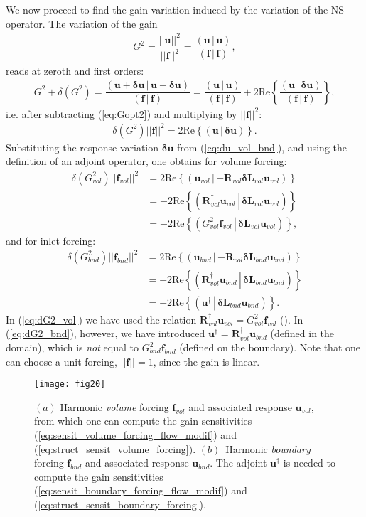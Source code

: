 \documentclass[11pt,onecolumn]{article}
\def\ff {\mathbf{f}}
\def\LL{\mathbf{L}}
\def\RR{\mathbf{R}}
\def\uu {\mathbf{u}}
\newcommand{\ps}   [2]{\ensuremath{\left(\left. {#1} \, \right| \, {#2} \right) }}
\providecommand\bdelta{\boldsymbol{\delta}}\providecommand\bnabla{\boldsymbol{\nabla}}
\begin{document}
We now proceed to find the gain variation induced by the variation of the NS operator.
The variation of the gain
\begin{align}	
G^2 = \dfrac{||\uu||^2}{||\ff||^2} 
= \dfrac{\ps{\uu}{\uu}}{\ps{\ff}{\ff}},
\label{eq:Gopt2}
\end{align}
%
reads at zeroth and first orders: 
%
\begin{align}
G^2+\delta (G^2) 
= \dfrac{\ps{\uu+\bdelta\uu}{\uu+\bdelta\uu}}{\ps{\ff}{\ff}} 
= \dfrac{\ps{\uu}{\uu}}{\ps{\ff}{\ff}}
+ 2 \mbox{Re}
\left\{
\dfrac{\ps{\uu}{\bdelta\uu}}{\ps{\ff}{\ff}} 
\right\},
\end{align}
i.e. after subtracting (\ref{eq:Gopt2}) and multiplying by $||\ff||^2$:
\begin{align}	
\delta (G^2) ||\ff||^2
= 2 \mbox{Re} 
\left\{ 
\ps{\uu}{\bdelta\uu}
\right\}.
\end{align}
%
Substituting the response variation $\bdelta\uu$ from (\ref{eq:du_vol_bnd}), and using the definition of an adjoint operator,
one obtains for volume forcing:
\begin{align}	
\delta (G_{vol}^2) ||\ff_{vol}||^2
&= 
2 \mbox{Re} \left\{\ps{\uu_{vol}}{-\RR_{vol} \bdelta\LL_{vol} \uu_{vol}}\right\}
\nonumber
\\
&=  -2 \mbox{Re} \left\{\ps{\RR_{vol}^\dag \uu_{vol}}{ \bdelta\LL_{vol} \uu_{vol}}\right\}
\nonumber
\\
&= -2 \mbox{Re} \left\{\ps{G_{vol}^2\ff_{vol}}{ \bdelta\LL_{vol} \uu_{vol}}\right\},
\label{eq:dG2_vol}
\end{align}
%
and for inlet forcing:
\begin{align}	
\delta (G_{bnd}^2) ||\ff_{bnd}||^2
&=
2 \mbox{Re} \left\{\ps{\uu_{bnd}}{-\RR_{vol} \bdelta\LL_{bnd}\uu_{bnd}}\right\}
\nonumber
\\
&= -2 \mbox{Re} \left\{\ps{\RR_{vol}^\dag \uu_{bnd}}{ \bdelta\LL_{bnd}\uu_{bnd}}\right\}
\nonumber
\\
&= -2 \mbox{Re} \left\{\ps{\uu^\dag}{ \bdelta\LL_{bnd}\uu_{bnd}}\right\}.
\label{eq:dG2_bnd}
\end{align}
%
In (\ref{eq:dG2_vol}) we have used the  relation 
$\RR_{vol}^\dag \uu_{vol} = G_{vol}^2\ff_{vol}$ (\cite{Brandt11, Boujo15a}).
In (\ref{eq:dG2_bnd}), however, we have introduced 
$\uu^\dag=\RR_{vol}^\dag \uu_{bnd}$ (defined in the domain), which is \textit{not} equal to $G_{bnd}^2\ff_{bnd}$ (defined on the boundary).
Note that one can choose a unit forcing, $||\ff||=1$, since the gain is linear.


\begin{figure}[] %
\centerline{
\texttt{[image: fig20]}
}
\vspace{-0.2cm}
\caption{
$(a)$ Harmonic \textit{volume} forcing $\ff_{vol}$  and associated response $\uu_{vol}$, from which one  can compute the gain sensitivities (\ref{eq:sensit_volume_forcing_flow_modif}) and (\ref{eq:struct_sensit_volume_forcing}).
$(b)$~Harmonic \textit{boundary} forcing $\ff_{bnd}$  and associated response $\uu_{bnd}$.
The adjoint $\uu^\dag$ is needed to compute the gain sensitivities 
(\ref{eq:sensit_boundary_forcing_flow_modif})
and (\ref{eq:struct_sensit_boundary_forcing}).
} 
\label{fig:sketch_adjoint}
\end{figure}
\end{document}
